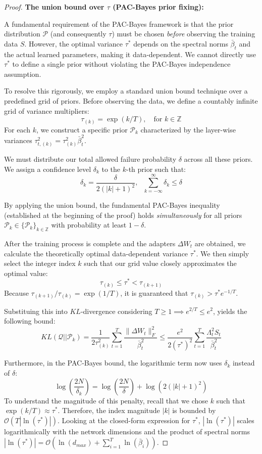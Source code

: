 \documentclass[a4paper,14pt]{extarticle}
\begin{document}
\begin{proof}
        \textbf{The union bound over $\tau$ (PAC-Bayes prior fixing):} 

        A fundamental requirement of the PAC-Bayes framework is that the prior distribution $\mathcal{P}$ (and consequently $\tau$) must be chosen \textit{before} observing the training data $S$. However, the optimal variance $\tau^*$ depends on the spectral norms $\bar{\beta}_t$ and the actual learned parameters, making it data-dependent. We cannot directly use $\tau^*$ to define a single prior without violating the PAC-Bayes independence assumption.
        
        To resolve this rigorously, we employ a standard union bound technique over a predefined grid of priors. Before observing the data, we define a countably infinite grid of variance multipliers:
        $$ \tau_{(k)} = \exp(k/T), \quad \text{for } k \in \mathbb{Z} $$
        For each $k$, we construct a specific prior $\mathcal{P}_k$ characterized by the layer-wise variances $\tau_{t,(k)}^2 = \tau_{(k)}^2 \bar{\beta}_t^2$.
        
        We must distribute our total allowed failure probability $\delta$ across all these priors. We assign a confidence level $\delta_k$ to the $k$-th prior such that:
        $$ \delta_k = \frac{\delta}{2(|k|+1)^2},~~~  \sum_{k=-\infty}^{\infty} \delta_k \leqslant \delta$$

        By applying the union bound, the fundamental PAC-Bayes inequality (established at the beginning of the proof) holds \textit{simultaneously} for all priors $\mathcal{P}_k \in \{\mathcal{P}_k\}_{k \in \mathbb{Z}}$ with probability at least $1-\delta$.
        
        After the training process is complete and the adapters $\Delta W_t$ are obtained, we calculate the theoretically optimal data-dependent variance $\tau^*$. We then simply select the integer index $k$ such that our grid value closely approximates the optimal value:
        $$ \tau_{(k)} \leqslant \tau^* < \tau_{(k+1)} $$
        Because $\tau_{(k+1)} / \tau_{(k)} = \exp(1/T)$, it is guaranteed that $\tau_{(k)} > \tau^* e^{-1/T}$. 

        Substituing this into $KL$-divergence considering $T\geqslant 1 \implies e^{2/T} \leqslant e^2$, yields the following bound:
        $$ KL(\mathcal{Q} || \mathcal{P}_k) = \frac{1}{2\tau_{(k)}^2} \sum_{t=1}^T \frac{\|\Delta W_t\|_F^2}{\bar{\beta}_t^2} \leqslant \frac{e^2}{2(\tau^*)^2} \sum_{t=1}^T \frac{\Lambda_t^2 S_t}{\bar{\beta}_t^2} $$

        Furthermore, in the PAC-Bayes bound, the logarithmic term now uses $\delta_k$ instead of $\delta$:
        $$ \log\left(\frac{2N}{\delta_k}\right) = \log\left(\frac{2N}{\delta}\right) + \log(2(|k|+1)^2) $$
        To understand the magnitude of this penalty, recall that we chose $k$ such that $\exp(k/T) \approx \tau^*$. Therefore, the index magnitude $|k|$ is bounded by $\mathcal{O}(T |\ln(\tau^*)|)$. Looking at the closed-form expression for $\tau^*$, $|\ln(\tau^*)|$ scales logarithmically with the network dimensions and the product of spectral norms $|\ln(\tau^*)| = \mathcal{O}(\ln(d_{max}) + \sum_{i=1}^T \ln(\bar{\beta}_i))$. 
        

\end{proof}
\end{document}
